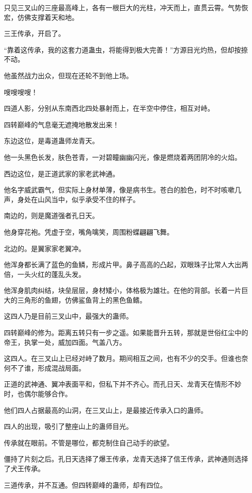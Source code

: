 \begin{this_body}
只见三叉山的三座最高峰上，各有一根巨大的光柱，冲天而上，直贯云霄。气势恢宏，仿佛支撑着天和地。

三王传承，开启了。

“靠着这传承，我的这套力道蛊虫，将能得到极大完善！”方源目光灼热，但却按捺不动。

他虽然战力出众，但现在还轮不到他上场。

嗖嗖嗖嗖！

四道人影，分别从东南西北四处暴射而上，在半空中停住，相互对峙。

四转巅峰的气息毫无遮掩地散发出来！

东边这位，是毒道蛊师龙青天。

他一头黑色长发，肤色苍青，一对碧瞳幽幽闪光，像是燃烧着两团阴冷的火焰。

西边这位，是正道武家的家老武神通。

他名字威武霸气，但实际上身材单薄，像是病书生。苍白的脸色，时不时咳嗽几声，身处在山风当中，似乎承受不住的样子。

南边的，则是魔道强者孔日天。

他身穿花袍。凭虚于空，嘴角噙笑，周围粉蝶翩翩飞舞。

北边的。是翼家家老翼冲。

他浑身都长满了蓝色的鱼鳞，形成片甲。鼻子高高的凸起，双眼珠子比常人大出两倍，一头火红的蓬乱头发。

他浑身肌肉纠结，块垒层层，身材矮小，体格极为雄壮。在他的背部。长着一片巨大的三角形的鱼翅，仿佛鲨鱼背上的黑色鱼鳍。

这四人乃是目前三叉山中，最强大的蛊师。

四转巅峰的修为。距离五转只有一步之遥。如果能晋升五转，那就是世俗红尘中的帝王，执掌一处，威加四面。气盖八方。

这四人。在三叉山上已经对峙了数月。期间相互之间，也有不少的交手。但谁也奈何不了谁，形成混战局面。

正道的武神通、翼冲表面平和，但私下并不齐心。而孔日天、龙青天在情形不妙时，也偶尔能够合作。

他们四人占据最高的山洞，在三叉山上，是最接近传承入口的蛊师。

四人的出现，吸引了整座山上的蛊师目光。

传承就在眼前。不管是哪位，都克制住自己动手的欲望。

僵持了片刻之后。孔日天选择了爆王传承，龙青天选择了信王传承，武神通则选择了犬王传承。

三道传承，并不互通。但四转巅峰的蛊师，却有四位。


\end{this_body}
